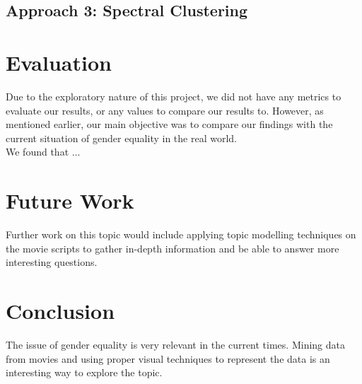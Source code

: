 \documentclass[12pt]{article}
\begin{document}
\subsection{Approach 3: Spectral Clustering}


\section{Evaluation}
Due to the exploratory nature of this project, we did not have any metrics to evaluate our results, or any values to compare our results to. However, as mentioned earlier, our main objective was to compare our findings with the current situation of gender equality in the real world. \\

We found that ...

\section{Future Work}
Further work on this topic would include applying topic modelling techniques on the movie scripts to gather in-depth information and be able to answer more interesting questions. 

\section{Conclusion}
The issue of gender equality is very relevant in the current times. Mining data from movies and using proper visual techniques to represent the data is an interesting way to explore the topic.



\end{document}
